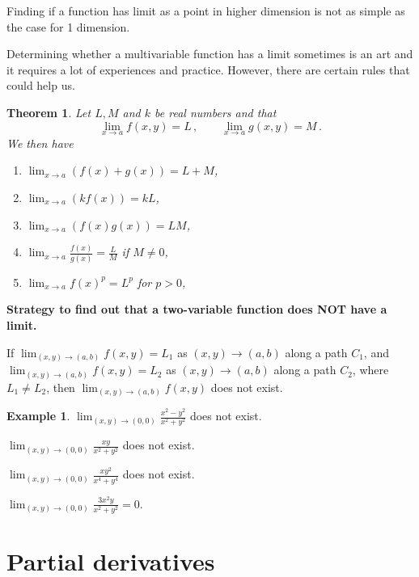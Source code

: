 \documentclass[
]{book}
\newtheorem{theorem}{Theorem}[chapter]
\theoremstyle{definition}
\theoremstyle{definition}
\newtheorem{example}{Example}[chapter]
\theoremstyle{definition}
\theoremstyle{definition}
\theoremstyle{remark}
\begin{document}
Finding if a function has limit as a point in higher dimension is not as simple as
the case for 1 dimension.

Determining whether a multivariable function has a limit sometimes is an art
and it requires a lot of experiences and practice.
However, there are certain rules that could help us.

\begin{theorem}

Let \(L,M\) and \(k\) be real numbers and that
\begin{equation*}
    \lim_{x \to a} f(x,y) = L \,, \qquad 
    \lim_{x \to a} g(x,y) = M \,.
\end{equation*}
We then have

\begin{enumerate}
\def\labelenumi{\arabic{enumi}.}
\item
  \(\displaystyle \lim_{x \to a} (f(x) + g(x)) = L + M\),
\item
  \(\displaystyle  \lim_{x \to a} (k f(x)) = kL\),
\item
  \(\displaystyle \lim_{x \to a} (f(x) g(x)) = LM\),
\item
  \(\displaystyle \lim_{x \to a} \frac{f(x)}{g(x)} = \frac{L}{M}\) if \(M \not= 0\),
\item
  \(\displaystyle \lim_{x \to a} {f(x)^p} = L^p\) for \(p>0\),
\end{enumerate}

\end{theorem}

\textbf{Strategy to find out that a two-variable function does NOT have a limit.}

If \(\lim_{(x,y) \to (a,b)} f(x,y) = L_1\) as \((x,y) \to (a,b)\) along a path \(C_1\),
and \(\lim_{(x,y) \to (a,b)} f(x,y) = L_2\) as \((x,y) \to (a,b)\) along a path \(C_2\),
where \(L_1 \neq L_2\), then \(\lim_{(x,y) \to (a,b)} f(x,y)\) does not exist.

\begin{example}
\(\lim_{(x,y)\to (0,0)} \frac{x^2 - y^2}{x^2 + y^2}\) does not exist.

\(\lim_{(x,y)\to (0,0)} \frac{xy}{x^2 + y^2}\) does not exist.

\(\lim_{(x,y)\to (0,0)} \frac{xy^2}{x^4 + y^4}\) does not exist.

\(\lim_{(x,y)\to (0,0)} \frac{3x^2y}{x^2 + y^2} = 0\).
\end{example}

\section{Partial derivatives}\label{partial-derivatives-1}
\end{document}

